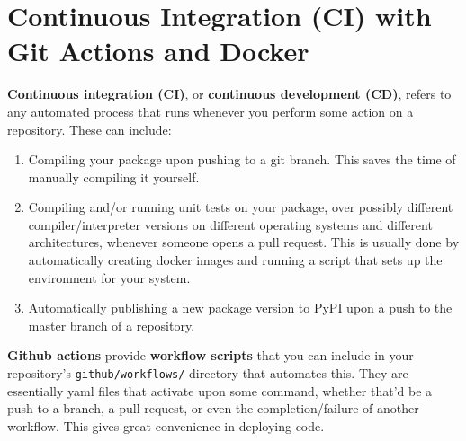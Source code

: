 \section{Continuous Integration (CI) with Git Actions and Docker} 

  \textbf{Continuous integration (CI)}, or \textbf{continuous development (CD)}, refers to any automated process that runs whenever you perform some action on a repository. These can include: 
  \begin{enumerate}
    \item Compiling your package upon pushing to a git branch. This saves the time of manually compiling it yourself. 
    \item Compiling and/or running unit tests on your package, over possibly different compiler/interpreter versions on different operating systems and different architectures, whenever someone opens a pull request. This is usually done by automatically creating docker images and running a script that sets up the environment for your system. 
    \item Automatically publishing a new package version to PyPI upon a push to the master branch of a repository. 
  \end{enumerate} 

  \textbf{Github actions} provide \textbf{workflow scripts} that you can include in your repository's \texttt{github/workflows/} directory that automates this. They are essentially yaml files that activate upon some command, whether that'd be a push to a branch, a pull request, or even the completion/failure of another workflow. This gives great convenience in deploying code. 

